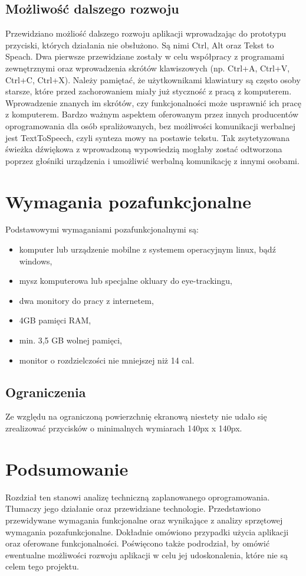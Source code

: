 \documentclass[twoside,a4paper]{book}
\begin{document}
\subsection{Możliwość dalszego rozwoju}
Przewidziano możliość dalszego rozwoju aplikacji wprowadzając do prototypu przyciski, których działania nie obsłużono. Są nimi Ctrl, Alt oraz Tekst to Speach. Dwa pierwsze przewidziane zostały w celu współpracy z programami zewnętrznymi oraz wprowadzenia  skrótów klawiszowych (np. Ctrl+A, Ctrl+V, Ctrl+C, Ctrl+X). Należy pamiętać, że użytkownikami klawiatury są często osoby starsze, które przed zachorowaniem miały już styczność z pracą z komputerem. Wprowadzenie znanych im skrótów, czy funkcjonalności może usprawnić ich pracę z komputerem. Bardzo ważnym aspektem oferowanym przez innych producentów oprogramowania dla osób spraliżowanych, bez możliwości komunikacji werbalnej jest TextToSpeech, czyli synteza mowy na postawie tekstu. Tak zsytetyzowana świeżka dźwiękowa z wprowadzoną wypowiedzią mogłaby zostać odtworzona poprzez głośniki urządzenia i umożliwić werbalną komunikację z innymi osobami.
\section{Wymagania pozafunkcjonalne}
Podstawowymi wymaganiami pozafunkcjonalnymi są:
\begin{itemize}
\item komputer lub urządzenie mobilne z systemem operacyjnym linux, bądź windows,
\item mysz komputerowa lub specjalne okluary do eye-trackingu,
\item dwa monitory do pracy z internetem, 
\item 4GB pamięci RAM, 
\item min. 3,5 GB wolnej pamięci,
\item monitor o rozdzielczości nie mniejszej niż 14 cal.
\end{itemize} 


\subsection{Ograniczenia}
Ze względu na ograniczoną powierzchnię ekranową niestety nie udało się zrealizować przycisków o minimalnych wymiarach 140px x 140px. 

\section{Podsumowanie}
Rozdział ten stanowi analizę techniczną zaplanowanego oprogramowania. Tłumaczy jego działanie oraz przewidziane technologie. Przedstawiono przewidywane wymagania funkcjonalne oraz wynikające z analizy sprzętowej wymagania pozafunkcjonalne. Dokładnie omówiono przypadki użycia aplikacji oraz oferowane funkcjonalności. Poświęcono także podrodział, by omówić ewentualne możliwości rozwoju aplikacji w celu jej udoskonalenia, które nie są celem tego projektu.
\end{document}

